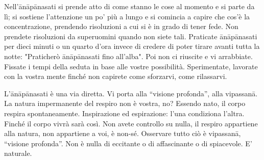Nell'ānāpānasati si prende atto di come stanno le cose al momento e si
parte da lì; si sostiene l'attenzione un po' più a lungo e si comincia a
capire che cos'è la concentrazione, prendendo risoluzioni a cui si è in
grado di tener fede. Non prendete risoluzioni da superuomini quando non
siete tali. Praticate ānāpānasati per dieci minuti o un quarto d'ora
invece di credere di poter tirare avanti tutta la notte: "Praticherò
ānāpānasati fino all'alba". Poi non ci riuscite e vi arrabbiate. Fissate
i tempi della seduta in base alle vostre possibilità. Sperimentate,
lavorate con la vostra mente finché non capirete come sforzarvi, come
rilassarvi.

L'ānāpānasati è una via diretta. Vi porta alla “visione profonda”, alla
vipassanā. La natura impermanente del respiro non è vostra, no? Essendo
nato, il corpo respira spontaneamente. Inspirazione ed espirazione:
l'una condiziona l'altra. Finché il corpo vivrà sarà così. Non avete
controllo su nulla, il respiro appartiene alla natura, non appartiene a
voi, è non-sé. Osservare tutto ciò è vipassanā, “visione profonda”. Non
è nulla di eccitante o di affascinante o di spiacevole. E' naturale.

